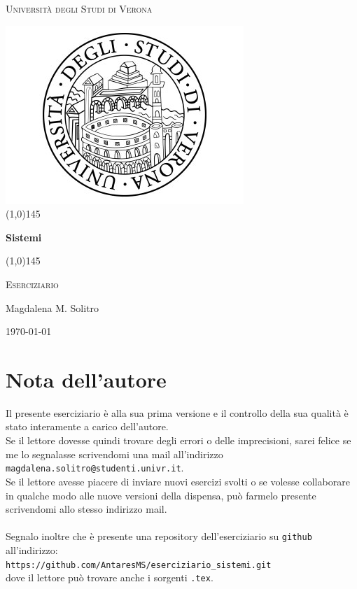 \documentclass[12pt,a4paper]{article}
\begin{document}
	\begin{titlepage}
		\centering
		\vspace*{\fill}
		{\scshape\LARGE Università degli Studi di Verona \par}
		\vspace{1.5cm}
		\includegraphics[scale=0.5]{./images/univr_logo.png}
		\vspace{1.5cm}\\
		\line(1,0){145} \\
		{\huge\bfseries Sistemi\par}
		\line(1,0){145} \\
		\vspace{0.5cm}
		{\scshape\Large Eserciziario\par}
		\vspace{2cm}
		{\Large Magdalena M. Solitro\par}
		\vspace{1cm}
		
		\vspace{5cm}
		\vspace*{\fill}
		{}
		{\large \today\par}
	\end{titlepage}
	\thispagestyle{empty}
	\section*{Nota dell'autore}
	Il presente eserciziario è alla sua prima versione e il controllo della sua qualità è stato interamente a carico dell'autore.\\Se il lettore dovesse quindi trovare degli errori o delle imprecisioni, sarei felice se me lo segnalasse scrivendomi una mail all'indirizzo \texttt{magdalena.solitro@studenti.univr.it}.\\
	Se il lettore avesse piacere di inviare nuovi esercizi svolti o se volesse collaborare in qualche modo alle nuove versioni della dispensa, può farmelo presente scrivendomi allo stesso indirizzo mail.\\ \\
	Segnalo inoltre che è presente una repository dell'eserciziario su \texttt{github} all'indirizzo:\\
	\texttt{https://github.com/AntaresMS/eserciziario_sistemi.git}\\ dove il lettore può trovare anche i sorgenti \texttt{.tex}.
	\newpage
	\tableofcontents
	\newpage
\end{document}
